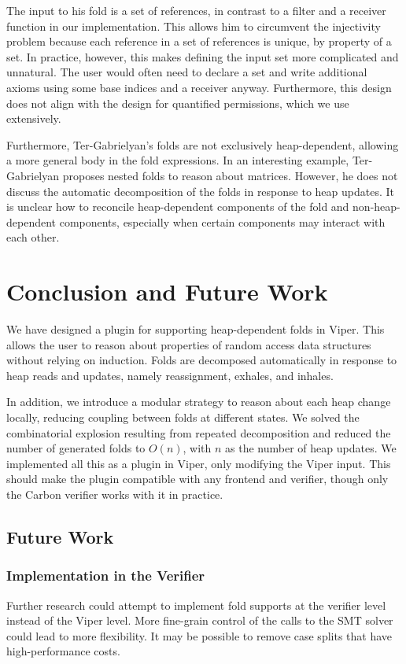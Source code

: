 \documentclass[msc,oneside]{ubcthesis}
\theoremstyle{definition}
\begin{document}
The input to his fold is a set of references, in contrast to a filter and a receiver function in our implementation. This allows him to circumvent the injectivity problem because each reference in a set of references is unique, by property of a set. In practice, however, this makes defining the input set more complicated and unnatural. The user would often need to declare a set and write additional axioms using some base indices and a receiver anyway. Furthermore, this design does not align with the design for quantified permissions, which we use extensively. 

Furthermore, Ter-Gabrielyan's folds are not exclusively heap-dependent, allowing a more general body in the fold expressions. In an interesting example, Ter-Gabrielyan proposes nested folds to reason about matrices. However, he does not discuss the automatic decomposition of the folds in response to heap updates. It is unclear how to reconcile heap-dependent components of the fold and non-heap-dependent components, especially when certain components may interact with each other. 

\chapter{Conclusion and Future Work}
We have designed a plugin for supporting heap-dependent folds in Viper. This allows the user to reason about properties of random access data structures without relying on induction. Folds are decomposed automatically in response to heap reads and updates, namely reassignment, exhales, and inhales. 

In addition, we introduce a modular strategy to reason about each heap change locally, reducing coupling between folds at different states. We solved the combinatorial explosion resulting from repeated decomposition and reduced the number of generated folds to $O(n)$, with $n$ as the number of heap updates. We implemented all this as a plugin in Viper, only modifying the Viper input. This should make the plugin compatible with any frontend and verifier, though only the Carbon verifier works with it in practice.


\section{Future Work}
\subsection{Implementation in the Verifier}
Further research could attempt to implement fold supports at the verifier level instead of the Viper level. More fine-grain control of the calls to the SMT solver could lead to more flexibility. It may be possible to remove case splits that have high-performance costs.
\end{document}
